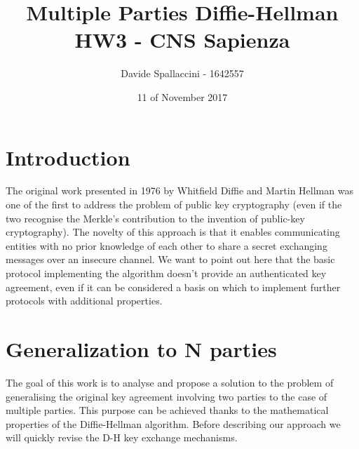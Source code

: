 \documentclass[11pt]{article}
\begin{document}
\title{Multiple Parties Diffie-Hellman\\ HW3 - CNS Sapienza}
\author{Davide Spallaccini - 1642557}
\date{11 of November 2017}
\maketitle

\section{Introduction}
The original work presented in 1976 by Whitfield Diffie and Martin Hellman \cite{original_dh} was one of the first to address the problem of public key cryptography (even if the two recognise the Merkle's contribution to the invention of public-key cryptography). The novelty of this approach is that it enables communicating entities with no prior knowledge of each other to share a secret exchanging messages over an insecure channel. We want to point out here that the basic protocol implementing the algorithm doesn't provide an authenticated key agreement, even if it can be considered a basis on which to implement further protocols with additional properties.

\section{Generalization to N parties}
The goal of this work is to analyse and propose a solution to the problem of generalising the original key agreement involving two parties to the case of multiple parties. This purpose can be achieved thanks to the mathematical properties of the Diffie-Hellman algorithm. Before describing our approach we will quickly revise the D-H key exchange mechanisms.
\end{document}
